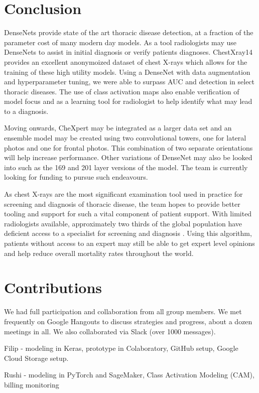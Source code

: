\documentclass{amia}
\begin{document}
\section*{Conclusion}
DenseNets provide state of the art thoracic disease detection, at a fraction of the parameter cost of many modern day models. As a tool radiologists may use DenseNets to assist in initial diagnosis or verify patients diagnoses. ChestXray14 provides an excellent anonymoized dataset of chest X-rays which allows for the training of these high utility models. Using a DenseNet with data augmentation and hyperparameter tuning, we were able to surpass AUC and detection in select thoracic diseases. The use of class activation maps also enable verification of model focus and as a learning tool for radiologist to help identify what may lead to a diagnosis.

Moving onwards, CheXpert may be integrated as a larger data set and an ensemble model may be created using two convolutional towers, one for lateral photos and one for frontal photos. This combination of two separate orientations will help increase performance. Other variations of DenseNet may also be looked into such as the 169 and 201 layer versions of the model. The team is currently looking for funding to pursue such endeavours.

As chest X-rays are the most significant examination tool used in practice for screening and diagnosis of thoracic disease, the team hopes to provide better tooling and support for such a vital component of patient support. With limited radiologists available, approximately two thirds of the global population have deficient access to a specialist for screening and diagnosis \cite{ref16}. Using this algorithm, patients without access to an expert may still be able to get expert level opinions and help reduce overall mortality rates throughout the world.

\pagebreak

\section*{Contributions}
We had full participation and collaboration from all group members. We met frequently on Google Hangouts to discuss strategies and progress, about a dozen meetings in all. We also collaborated via Slack (over 1000 messages).

Filip - modeling in Keras, prototype in Colaboratory, GitHub setup, Google Cloud Storage setup.

Rushi - modeling in PyTorch and SageMaker, Class Activation Modeling (CAM), billing monitoring
\end{document}
